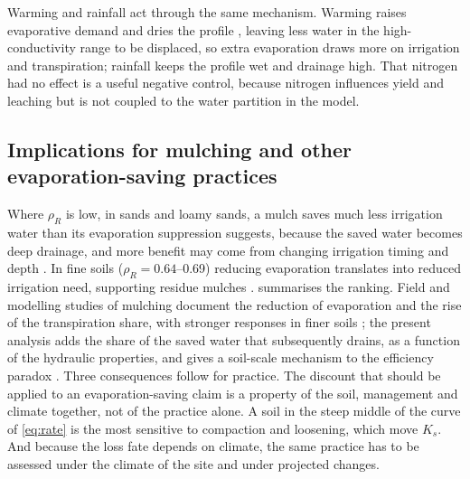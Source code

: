 \documentclass[review,12pt,authoryear]{elsarticle}
\begin{document}
Warming and rainfall act through the same mechanism. Warming raises evaporative demand and dries the profile \citep{Or2013,Shokri2011,Lehmann2008}, leaving less water in the high-conductivity range to be displaced, so extra evaporation draws more on irrigation and transpiration; rainfall keeps the profile wet and drainage high. That nitrogen had no effect is a useful negative control, because nitrogen influences yield and leaching but is not coupled to the water partition in the model.

\subsection{Implications for mulching and other evaporation-saving practices}
Where $\rho_R$ is low, in sands and loamy sands, a mulch saves much less irrigation water than its evaporation suppression suggests, because the saved water becomes deep drainage, and more benefit may come from changing irrigation timing and depth \citep{Fereres2007,Playan2006}. In fine soils ($\rho_R=0.64$--0.69) reducing evaporation translates into reduced irrigation need, supporting residue mulches \citep{BalwinderSingh2011,Vuaille2024}.  summarises the ranking. Field and modelling studies of mulching document the reduction of evaporation and the rise of the transpiration share, with stronger responses in finer soils \citep{Zheng2021,Kang2024}; the present analysis adds the share of the saved water that subsequently drains, as a function of the hydraulic properties, and gives a soil-scale mechanism to the efficiency paradox \citep{Ward2008,Grafton2018,Perry2017}. Three consequences follow for practice. The discount that should be applied to an evaporation-saving claim is a property of the soil, management and climate together, not of the practice alone. A soil in the steep middle of the curve of \cref{eq:rate} is the most sensitive to compaction and loosening, which move $K_s$. And because the loss fate depends on climate, the same practice has to be assessed under the climate of the site and under projected changes.
\end{document}
